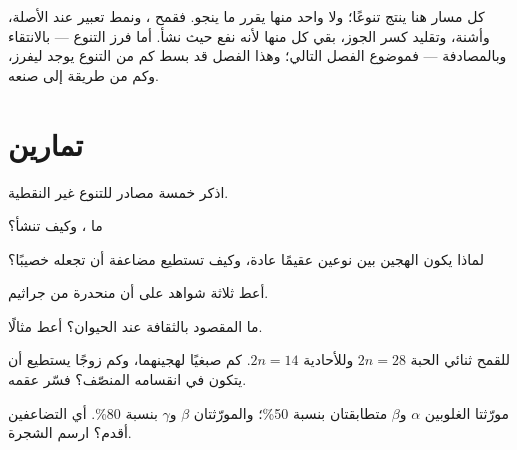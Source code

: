 \begin{remark}\label{rem:g12:diversification-of-life:selection}
كل مسار هنا ينتج تنوعًا؛ ولا واحد منها يقرر ما ينجو. فقمح ، ونمط تعبير عند الأصلة، وأشنة، وتقليد كسر الجوز، بقي كل منها
لأنه نفع حيث نشأ. أما فرز التنوع --- بالانتقاء وبالمصادفة --- فموضوع
الفصل التالي؛ وهذا الفصل قد بسط كم من التنوع يوجد ليفرز، وكم من طريقة
إلى صنعه.
\end{remark}

\section{تمارين}

\begin{exercise}[$\star$]\label{exo:g12:diversification-of-life:1}
اذكر خمسة مصادر للتنوع غير  النقطية.
\end{exercise}

\begin{exercise}[$\star$]\label{exo:g12:diversification-of-life:2}
ما ، وكيف تنشأ؟
\end{exercise}

\begin{exercise}[$\star$]\label{exo:g12:diversification-of-life:3}
لماذا يكون الهجين بين نوعين عقيمًا عادة، وكيف تستطيع مضاعفة 
أن تجعله خصيبًا؟
\end{exercise}

\begin{exercise}[$\star$]\label{exo:g12:diversification-of-life:4}
أعط ثلاثة شواهد على أن  منحدرة من جراثيم.
\end{exercise}

\begin{exercise}[$\star$]\label{exo:g12:diversification-of-life:5}
ما المقصود بالثقافة عند الحيوان؟ أعط مثالًا.
\end{exercise}

\begin{exercise}[$\star\star$]\label{exo:g12:diversification-of-life:6}
للقمح ثنائي الحبة $2n = 28$ وللأحادية $2n = 14$. كم صبغيًا لهجينهما،
وكم زوجًا يستطيع أن يتكون في انقسامه المنصّف؟ فسّر عقمه.
\end{exercise}

\begin{exercise}[$\star\star$]\label{exo:g12:diversification-of-life:7}
مورّثتا الغلوبين $\alpha$ و$\beta$ متطابقتان بنسبة 50\%؛ والمورّثتان
$\beta$ و$\gamma$ بنسبة 80\%. أي التضاعفين أقدم؟ ارسم الشجرة.
\end{exercise}

